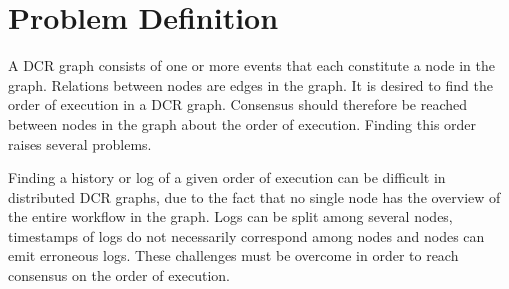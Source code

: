 \chapter{Problem Definition}

A DCR graph consists of one or more events that each constitute a node in the graph. Relations between nodes are edges in the graph.
It is desired to find the order of execution in a DCR graph. Consensus should therefore be reached between nodes in the graph about the order of execution. Finding this order raises several problems.


Finding a history or log of a given order of execution can be difficult in distributed DCR graphs, due to the fact that no single node has the overview of the entire workflow in the graph.
Logs can be split among several nodes, timestamps of logs do not necessarily correspond among nodes and nodes can emit erroneous logs. These challenges must be overcome in order to reach consensus on the order of execution.
